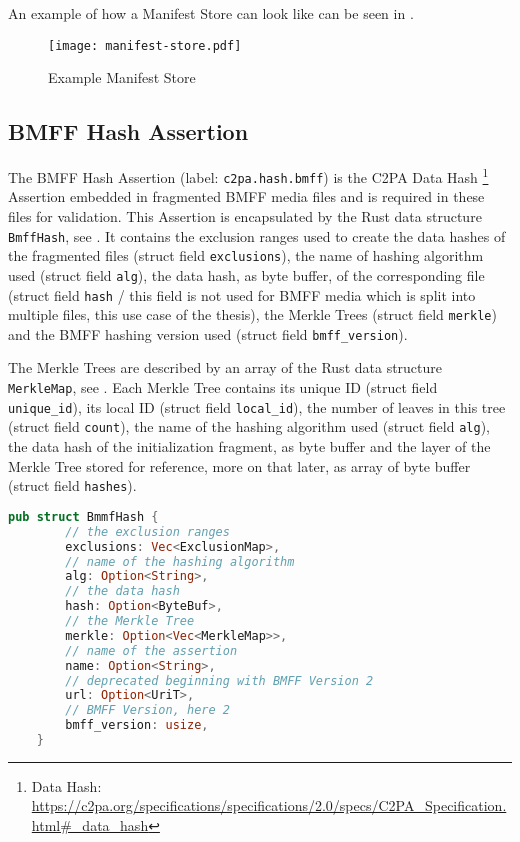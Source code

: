 An example of how a Manifest Store can look like can be seen in .

\begin{figure}
    \centering
    \texttt{[image: manifest-store.pdf]}
    \caption{Example Manifest Store \cite{manifestStore}}
    \label{fig:manifest_store}
\end{figure}

\subsection{BMFF Hash Assertion\label{sec:bmff_assertion}}

The BMFF Hash Assertion (label: \texttt{c2pa.hash.bmff}) is the C2PA Data Hash \footnote{Data Hash: \url{https://c2pa.org/specifications/specifications/2.0/specs/C2PA_Specification.html\#_data_hash}} Assertion embedded in fragmented BMFF media files and is required in these files for validation. This Assertion is encapsulated by the Rust data structure \texttt{BmffHash}, see . It contains the exclusion ranges used to create the data hashes of the fragmented files (struct field \texttt{exclusions}), the name of hashing algorithm used (struct field \texttt{alg}), the data hash, as byte buffer, of the corresponding file (struct field \texttt{hash} / this field is not used for BMFF media which is split into multiple files, this use case of the thesis), the Merkle Trees (struct field \texttt{merkle}) and the BMFF hashing version used (struct field \texttt{bmff\_version}).

The Merkle Trees are described by an array of the Rust data structure \texttt{MerkleMap}, see . Each Merkle Tree contains its unique ID (struct field \texttt{unique\_id}), its local ID (struct field \texttt{local\_id}), the number of leaves in this tree (struct field \texttt{count}), the name of the hashing algorithm used (struct field \texttt{alg}), the data hash of the initialization fragment, as byte buffer and the layer of the Merkle Tree stored for reference, more on that later, as array of byte buffer (struct field \texttt{hashes}).

\begin{minipage}{0.95\linewidth}
\begin{lstlisting}[caption={BmffHash Rust Definition}, label=code:bmff_hash, language=Rust, captionpos=b]
    pub struct BmmfHash {
        // the exclusion ranges
        exclusions: Vec<ExclusionMap>,
        // name of the hashing algorithm
        alg: Option<String>,
        // the data hash
        hash: Option<ByteBuf>,
        // the Merkle Tree
        merkle: Option<Vec<MerkleMap>>,
        // name of the assertion
        name: Option<String>,
        // deprecated beginning with BMFF Version 2
        url: Option<UriT>,
        // BMFF Version, here 2
        bmff_version: usize,
    }
\end{lstlisting}
\end{minipage}


